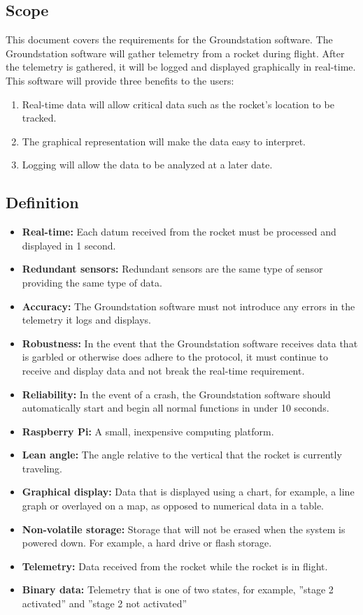 \documentclass[10pt,journal,draftclsnofoot,onecolumn]{IEEEtran}
\begin{document}
	\subsection{Scope}
	This document covers the requirements for the Groundstation software.
	The Groundstation software will gather telemetry from a rocket during flight.
	After the telemetry is gathered, it will be logged and displayed graphically in real-time.
	This software will provide three benefits to the users:
	\begin{enumerate}
		\item Real-time data will allow critical data such as the rocket's location to be tracked.
		\item The graphical representation will make the data easy to interpret.
		\item Logging will allow the data to be analyzed at a later date.
	\end{enumerate}	
			
	\subsection{Definition}
	
	\begin{itemize}
		\item \textbf{Real-time:} Each datum received from the rocket must be processed and displayed in 1 second.
		\item \textbf{Redundant sensors:} Redundant sensors are the same type of sensor providing the same type of data.
		\item \textbf{Accuracy:} The Groundstation software must not introduce any errors in the telemetry it logs and displays.
		\item \textbf{Robustness:} In the event that the Groundstation software receives data that is garbled or otherwise does adhere to the protocol, it must continue to receive and display data and not break the real-time requirement.
		\item \textbf{Reliability:} In the event of a crash, the Groundstation software should automatically start and begin all normal functions in under 10 seconds.
		\item \textbf{Raspberry Pi:} A small, inexpensive computing platform.
		\item \textbf{Lean angle:} The angle relative to the vertical that the rocket is currently traveling.
		\item \textbf{Graphical display:} Data that is displayed using a chart, for example, a line graph or overlayed on a map, as opposed to numerical data in a table.
		\item \textbf{Non-volatile storage:} Storage that will not be erased when the system is powered down. For example, a hard drive or flash storage.
		\item \textbf{Telemetry:} Data received from the rocket while the rocket is in flight.
		\item \textbf{Binary data:} Telemetry that is one of two states, for example, ''stage 2 activated'' and ''stage 2 not activated''
	\end{itemize}	
	
\end{document}
